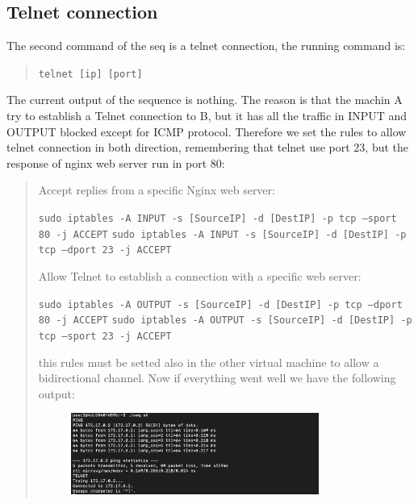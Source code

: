 \documentclass[11pt]{article}
\begin{document}
\subsection{Telnet connection}
The second command of the seq is a telnet connection, the running command is:

\begin{quote}
  \texttt{telnet [ip] [port]}\newline
\end{quote}

The current output of the sequence is nothing. The reason is that the machin A try to establish a Telnet connection to B, but it has all the traffic in INPUT and OUTPUT blocked except for ICMP protocol. Therefore we set the rules to allow telnet connection in both direction, remembering that telnet use port 23, but the response of nginx web server run in port 80:

\begin{quote}
  Accept replies from a specific Nginx web server:

  \texttt{sudo iptables -A INPUT -s [SourceIP] -d [DestIP] -p tcp --sport 80 -j ACCEPT}\newline
  \texttt{sudo iptables -A INPUT -s [SourceIP] -d [DestIP] -p tcp --dport 23 -j ACCEPT}\newline

  Allow Telnet to establish a connection with a specific web server:

  \texttt{sudo iptables -A OUTPUT -s [SourceIP] -d [DestIP] -p tcp --dport 80 -j ACCEPT}\newline
  \texttt{sudo iptables -A OUTPUT -s [SourceIP] -d [DestIP] -p tcp --sport 23 -j ACCEPT}\newline

  this rules must be setted also in the other virtual machine to allow a bidirectional channel. Now if everything went well we have the following output:

  \begin{figure}[!ht]
    \centering
    \includegraphics[width=0.8\textwidth]{pic5-hw8-1635747.png}
    \label{fig:conf}
  \end{figure}
\end{quote}
\end{document}
